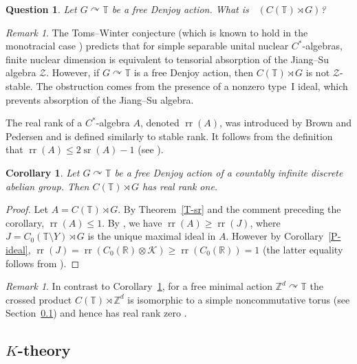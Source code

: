 \documentclass[11pt,a4paper,leqno]{amsart}
\newtheorem{cor}[thm]{Corollary}
\newtheorem{question}{Question}
\theoremstyle{definition}
\theoremstyle{remark}
\newtheorem{rem}[thm]{Remark}
\numberwithin{equation}{section}
\theoremstyle{plain}
\DeclareMathOperator{\sr}{sr}
\DeclareMathOperator{\rr}{rr}
\DeclareMathOperator{\nucdim}{\dim_{\operatorname{nuc}}}
\newcommand{\Zb}{\mathbb{Z}}
\newcommand{\Tb}{\mathbb{T}}
\newcommand{\Rb}{\mathbb{R}}
\newcommand{\Kc}{\mathcal{K}}
\begin{document}
\begin{question}
    Let $G\curvearrowright \Tb$ be a free Denjoy action. What is $\nucdim(C(\Tb)\rtimes G)$? 
\end{question}

\begin{rem}
	The Toms--Winter conjecture (which is known to hold in the monotracial case \cite{SatWhiWin15}) predicts that for simple separable unital nuclear $C^*$-algebras, finite nuclear dimension is equivalent to tensorial absorption of the Jiang--Su algebra $\mathcal{Z}$. However, if $G \curvearrowright \mathbb{T}$ is a free Denjoy action, then $C(\mathbb{T}) \rtimes G$ is not $\mathcal{Z}$-stable. The obstruction comes from the presence of a nonzero type~I ideal, which prevents absorption of the Jiang--Su algebra. 
\end{rem}

The real rank of a $C^*$-algebra $A$, denoted $\rr(A)$, was introduced by Brown and Pedersen \cite{BroPed91} and is defined similarly to stable rank. It follows from the definition that $\rr(A) \le 2\sr(A) - 1$ (see \cite[Proposition 1.2]{BroPed91}).

\begin{cor}\label{C-rr}
    Let $G \curvearrowright \Tb$ be a free Denjoy action of a countably infinite discrete abelian group. Then $C(\Tb)\rtimes G$ has real rank one.
\end{cor}

\begin{proof}
    Let $A = C(\Tb)\rtimes G$. By Theorem~\ref{T-sr} and the comment preceding the corollary, $\rr(A)\le 1$. By \cite[Th\'eor\`eme 1.4]{Has95}, we have $\rr(A)\ge \rr(J)$, where $J = C_0(\Tb\setminus Y)\rtimes G$ is the unique maximal ideal in $A$. However by Corollary~\ref{P-ideal}, $\rr(J) = \rr(C_0(\Rb)\otimes \Kc) \ge \rr(C_0(\Rb)) = 1$ (the latter equality follows from \cite[Theorem 2.5]{BroPed91}). 
\end{proof}

\begin{rem}
	In contrast to Corollary~\ref{C-rr}, for a free minimal action $\Zb^d \curvearrowright \Tb$ the crossed product $C(\Tb)\rtimes \Zb^d$ is isomorphic to a simple noncommutative torus (see Section~\ref{S-Kthy}) and hence has real rank zero \cite[Theorem 3.8]{Phi06}. 
\end{rem}

\subsection{$K$-theory} \label{S-Kthy}
\end{document}
